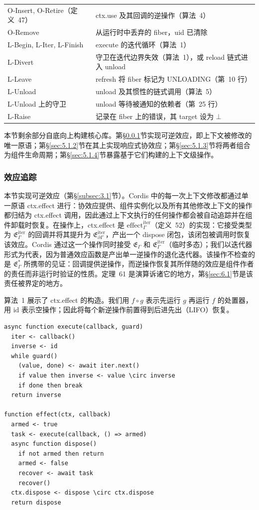 \begin{table}[htbp]
\begin{tabular}{ll}
O-Insert, O-Retire（定义~47） & ctx.use 及其回调的逆操作（算法~4） \\
O-Remove & 从运行时中丢弃的 fiber，uid 已清除 \\
L-Begin, L-Iter, L-Finish & execute 的迭代循环（算法~1） \\
L-Divert & 守卫在迭代边界失效（算法~1），或 reload 链式进入 unload \\
L-Leave & refresh 将 fiber 标记为 UNLOADING（第~10 行） \\
L-Unload & unload 及其惯性的链式调用（算法~5） \\
L-Unload 上的守卫 & unload 等待被通知的依赖者（第~25 行） \\
L-Raise & 记录在 fiber 上的错误，其 target 设为 $\bot$ \\
\hline
\end{tabular}
\end{table}

本节剩余部分自底向上构建核心库。第\S\ref{sec:5.1.1}节实现可逆效应，即上下文被修改的唯一原语；第\S\ref{sec:5.1.2}节在其上实现响应式协效应；第\S\ref{sec:5.1.3}节将两者组合为组件生命周期；第\S\ref{sec:5.1.4}节暴露基于它们构建的上下文级操作。

\subsubsection{效应追踪}\label{sec:5.1.1}

本节实现可逆效应（第\S\ref{subsec:3.1}节）。Cordis 中的每一次上下文修改都通过单一原语 ctx.effect 进行：协效应提供、组件实例化以及所有其他修改上下文的操作都归结为 ctx.effect 调用，因此通过上下文执行的任何操作都会被自动追踪并在组件卸载时恢复。在操作上，ctx.effect 是 $\mathrm{effect}_\Gamma^{\mathrm{iter}}$（定义~52）的实现：它接受类型为 $\mathfrak{E}_\Gamma^{\mathrm{iter}}$ 的回调并将其提升为 $\mathfrak{E}_{\partial\Gamma}^{\mathrm{iter}}$，产出一个 dispose 闭包，该闭包被调用时恢复该效应。Cordis 通过这一个操作同时接受 $\mathfrak{E}_\Gamma$ 和 $\mathfrak{E}_\Gamma^{\mathrm{iter}}$（临时多态）；我们以迭代器形式为代表，因为普通效应函数是产出单一逆操作的退化迭代器。该操作不检查的是 $\mathfrak{E}_\Gamma^*$ 所携带的见证：回调提供逆操作，而逆操作恢复其所伴随的效应是组件作者的责任而非运行时验证的性质。定理~61 是演算诉诸它的地方，第\S\ref{sec:6.1}节是该责任被界定的地方。

算法~1 展示了 ctx.effect 的构造。我们用 $f \circ g$ 表示先运行 $g$ 再运行 $f$ 的处置器，用 $\mathrm{id}$ 表示空操作；因此将每个新逆操作前置得到后进先出（LIFO）恢复。

\begin{lstlisting}[caption={效应追踪}]
async function execute(callback, guard)
  iter <- callback()
  inverse <- id
  while guard()
    (value, done) <- await iter.next()
    if value then inverse <- value \circ inverse
    if done then break
  return inverse

function effect(ctx, callback)
  armed <- true
  task <- execute(callback, () => armed)
  async function dispose()
    if not armed then return
    armed <- false
    recover <- await task
    recover()
  ctx.dispose <- dispose \circ ctx.dispose
  return dispose
\end{lstlisting}

